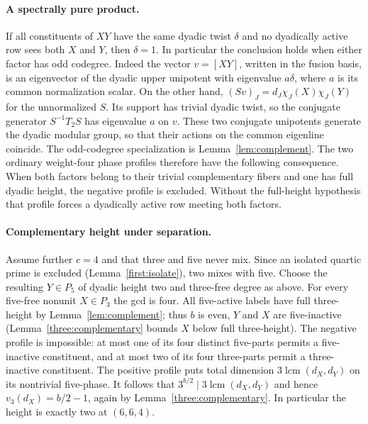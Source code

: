 \documentclass[11pt,a4paper]{article}
\numberwithin{equation}{section}
\theoremstyle{remark}
\begin{document}
\paragraph{A spectrally pure product.}
If all constituents of $XY$ have the same dyadic twist $\delta$ and
no dyadically active row sees both $X$ and $Y$, then $\delta=1$.
In particular the conclusion holds when either factor has odd codegree.
Indeed the vector $v=[XY]$, written in the fusion basis, is an eigenvector
of the dyadic upper unipotent with eigenvalue $a\delta$, where $a$ is its
common normalization scalar. On the other hand,
$(Sv)_J=d_J\chi_J(X)\chi_J(Y)$ for the unnormalized $S$.
Its support has trivial dyadic twist, so the conjugate generator
$S^{-1}T_2 S$ has eigenvalue $a$ on $v$. These two conjugate unipotents
generate the dyadic modular group, so that their actions on the common
eigenline coincide. The odd-codegree specialization is Lemma~\ref{lem:complement}.
The two ordinary weight-four phase profiles therefore have the following
consequence. When both factors belong to their trivial complementary
fibers and one has full dyadic height, the negative profile is excluded.
Without the full-height hypothesis that profile forces a dyadically
active row meeting both factors.

\paragraph{Complementary height under separation.}
Assume further $c=4$ and that three and five never mix. Since an isolated
quartic prime is excluded (Lemma~\ref{first:isolate}), two mixes with five. Choose
the resulting $Y\in P_5$ of dyadic height two and three-free degree as above.
For every five-free nonunit $X\in P_3$ the gcd is four. All five-active
labels have full three-height by Lemma~\ref{lem:complement}; thus $b$ is even, $Y$ and
$X$ are five-inactive (Lemma~\ref{three:complementary} bounds $X$ below full three-height).
The negative profile is impossible: at most one of its four distinct
five-parts permits a five-inactive constituent, and at most two of its
four three-parts permit a three-inactive constituent. The positive
profile puts total dimension $3\operatorname{lcm}(d_X,d_Y)$ on its
nontrivial five-phase. It follows that
$3^{b/2}\mid3\operatorname{lcm}(d_X,d_Y)$ and hence
$v_3(d_X)=b/2-1$, again by Lemma~\ref{three:complementary}. In particular the height is
exactly two at $(6,6,4)$.
\end{document}
